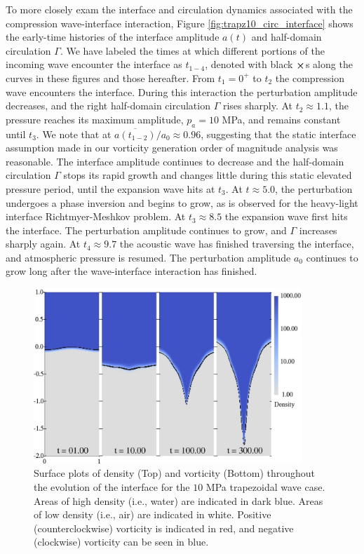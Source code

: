 To more closely exam the interface and circulation dynamics associated
with the compression wave-interface interaction, Figure
\ref{fig:trapz10_circ_interface} shows the early-time histories of the
interface amplitude $a(t)$ and half-domain circulation $\Gamma$. We
have labeled the times at which different portions of the incoming
wave encounter the interface as $t_{1-4}$, denoted with black
$\boldsymbol{\times}$s along the curves in these figures and those
hereafter. From $t_1=0^+$ to $t_2$ the compression wave encounters the
interface. During this interaction the perturbation amplitude
decreases, and the right half-domain circulation $\Gamma$ rises
sharply. At $t_2\approx1.1$, the pressure reaches its maximum
amplitude, $p_a=10$ MPa, and remains constant until $t_3$. We note
that at $\overline{a(t_{1-2})}/a_0\approx0.96$, suggesting that the
static interface assumption made in our vorticity generation order of
magnitude analysis was reasonable. The interface amplitude continues
to decrease and the half-domain circulation $\Gamma$ stops its rapid
growth and changes little during this static elevated pressure period,
until the expansion wave hits at $t_3$. At $t\approx 5.0$, the
perturbation undergoes a phase inversion and begins to grow, as is
observed for the heavy-light interface Richtmyer-Meshkov problem. At
$t_3\approx8.5$ the expansion wave first hits the interface. The
perturbation amplitude continues to grow, and $\Gamma$ increases
sharply again. At $t_4\approx9.7$ the acoustic wave has finished
traversing the interface, and atmospheric pressure is resumed. The
perturbation amplitude $a_0$ continues to grow long after the
wave-interface interaction has finished.
%
\begin{figure}[h] 
  \centering
\includegraphics[width=0.9\textwidth]{./figs/lung_figs/snapshots_density_t1}
\caption[The evolution of the acoustically perturbed interface and vorticity field]{Surface plots of density (Top) and vorticity (Bottom)
  throughout the evolution of the interface for the $10$ MPa
  trapezoidal wave case. Areas of high density (i.e., water) are
indicated in dark blue. Areas of low density (i.e., air) are indicated
in white.  Positive (counterclockwise) vorticity is indicated in red,
and negative (clockwise) vorticity can be seen in blue.}
  \label{fig:interface_snapshots}
\end{figure}
